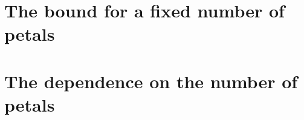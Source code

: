 \documentclass[11pt]{article}
\begin{document}
\maketitle

\begin{abstract}
We prove the fixed-petal sunflower conjecture of Erd\H{o}s and Rado.
For every \(r\ge3\), a family of more than \(B_r^k\) distinct sets of
size at most \(k\) contains \(r\) sets whose pairwise intersections are
all the same. The base depends only on \(r\) and satisfies
\(\log B_r=O((\log r)^4(\log\log(2r))^{5/2})\).
\end{abstract}



\par{}
{\small\tableofcontents}

\clearpage
\part{The bound for a fixed number of petals}\label{part:fixed}




\par{}
\part{The dependence on the number of petals}\label{part:quant}










\end{document}
